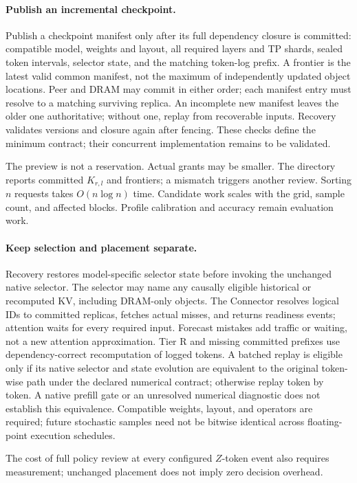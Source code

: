 \paragraph{Publish an incremental checkpoint.}
Publish a checkpoint manifest only after its full dependency closure is
committed: compatible model, weights and layout, all required layers and TP
shards, sealed token intervals, selector state, and the matching token-log
prefix. A frontier is the latest valid common manifest, not the maximum
of independently updated object locations. Peer and DRAM may commit in
either order; each manifest entry must resolve to a matching surviving
replica. An incomplete new manifest leaves the older one authoritative;
without one, replay from recoverable inputs. Recovery validates versions
and closure again after fencing. These checks define the minimum contract;
their concurrent implementation remains to be validated.

The preview is not a reservation. Actual grants may be smaller. The
directory reports committed $K_{r,l}$ and frontiers; a mismatch triggers
another review. Sorting $n$ requests takes $O(n\log n)$ time. Candidate
work scales with the grid, sample count, and affected blocks. Profile
calibration and accuracy remain evaluation work.

\paragraph{Keep selection and placement separate.}
Recovery restores model-specific selector state before invoking the
unchanged native selector. The selector may name any causally eligible
historical or recomputed KV, including DRAM-only objects. The Connector
resolves logical IDs to committed replicas, fetches actual misses, and
returns readiness events; attention waits for every required input.
Forecast mistakes add traffic or waiting, not a new attention approximation.
Tier R and missing committed prefixes use dependency-correct recomputation
of logged tokens. A batched replay is eligible only if its native selector
and state evolution are equivalent to the original token-wise path under
the declared numerical contract; otherwise replay token by token. A native
prefill gate or an unresolved numerical diagnostic does not establish this
equivalence. Compatible weights, layout, and operators are required;
future stochastic samples need not be bitwise identical across floating-point
execution schedules.

The cost of full policy review at every configured $Z$-token event
also requires measurement; unchanged placement does not imply zero
decision overhead.
